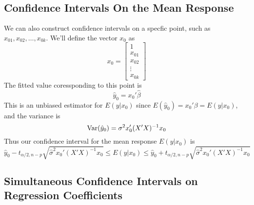 \subsection{Confidence Intervals On the Mean Response}
\renewcommand{\arraystretch}{1.25}
We can also construct confidence intervals on a specfic point, such as $x_{01},x_{02}, \ldots, x_{0k}$. We'll define the vector $x_0$ as 
\[x_0 = \begin{bmatrix}
    1 \\ x_{01} \\ x_{02} \\ \vdots \\ x_{0k}
\end{bmatrix}\]
The fitted value coressponding to this point is 
\[\hat{y}_0 = x_0'\hat{\beta}\]
This is an unbiased estimator for $E(y|x_0)$ since $E(\hat{y}_0) = x_0'\beta = E(y|x_0)$, and the variance is 
\[\operatorname{Var}(\hat{y}_0) = \sigma^2x_0'(X'X)^{-1}x_0\]
Thus our confidence interval for the mean response $E(y|x_0)$ is 
\[\hat{y}_0 - t_{\alpha/2,n-p}\sqrt{\hat{\sigma}^2x_0'(X'X)^{-1}x_0} \leq E(y|x_0) \leq \hat{y}_0 + t_{\alpha/2,n-p}\sqrt{\hat{\sigma}^2x_0'(X'X)^{-1}x_0}\]
\subsection{Simultaneous Confidence Intervals on Regression Coefficients}